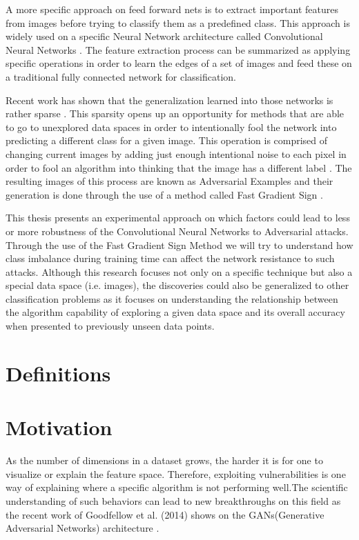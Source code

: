 A more specific approach on feed forward nets is to extract important features from images before trying to classify them as a predefined class. This approach is widely used on a specific Neural Network architecture called Convolutional Neural Networks \cite{matsugu2003subject}. The feature extraction process can be summarized as applying specific operations in order to learn the edges of a set of images and feed these on a traditional fully connected network for classification. 

Recent work has shown that the generalization learned into those networks is rather sparse \cite{goodfellow2016}. This sparsity opens up an opportunity for methods that are able to go to unexplored data spaces in order to intentionally fool the network into predicting a different class for a given image. This operation is comprised of changing current images by adding just enough intentional noise to each pixel in order to fool an algorithm into thinking that the image has a different label \cite{goodfellow2014}\cite{papernot2016transf}\cite{goodfellow2016}\cite{szegedy2013}. The resulting images of this process are known as Adversarial Examples and their generation is done through the use of a method called Fast Gradient Sign \cite{goodfellow2014}.

This thesis presents an experimental approach on which factors could lead to less or more robustness of the Convolutional Neural Networks to Adversarial attacks. Through the use of the Fast Gradient Sign Method we will try to understand how class imbalance during training time can affect the network resistance to such attacks. Although this research focuses not only on a specific technique but also a special data space (i.e. images), the discoveries could also be generalized to other classification problems as it focuses on understanding the relationship between the algorithm capability of exploring a given data space and its overall accuracy when presented to previously unseen data points.

\section{Definitions}
\section{Motivation}

As the number of dimensions in a dataset grows, the harder it is for one to visualize or explain the feature space. Therefore, exploiting vulnerabilities is one way of explaining where a specific algorithm is not performing well.The scientific understanding of such behaviors can lead to new breakthroughs on this field as the recent work of Goodfellow et al. (2014) shows on the GANs(Generative Adversarial Networks) architecture \cite{goodfellow2014generative}. 

